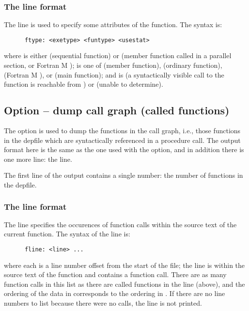\subsubsection{The  line format}

The  line is used to specify some attributes of the function.
The syntax is:
\begin{verbatim}
      ftype: <exetype> <funtype> <usestat>
\end{verbatim}
\noindent
where  is either  (sequential function) or
 (member function called in a parallel section, or Fortran M
);  is one of  (member
function),  (ordinary function),  (Fortran M
), or  (main function); and  is
 (a syntactically visible call to the function is reachable
from ) or  (unable to determine).

\subsection{Option  -- dump call graph (called functions)}

The  option is used to dump the functions in the call
graph, i.e., those functions in the depfile which are syntactically
referenced in a procedure call. The output format here is the same
as the one used with the  option, and in addition there
is one more line: the  line.

The first line of the output contains a single number: the number of functions
in the depfile.

\subsubsection{The  line format}

The  line specifies the occurences of function calls within
the source text of the current function. The syntax of the 
line is:
\begin{verbatim}
      fline: <line> ...
\end{verbatim}
\noindent
where each  is a line number offset from the start of the
file; the line is within the source text of the function and contains a
function call. There are as many function calls in this list as there
are called functions in the  line (above), and the ordering
of the data in  corresponds to the ordering in
.  If there are no line numbers to list because there were
no calls, the  line is not printed.

